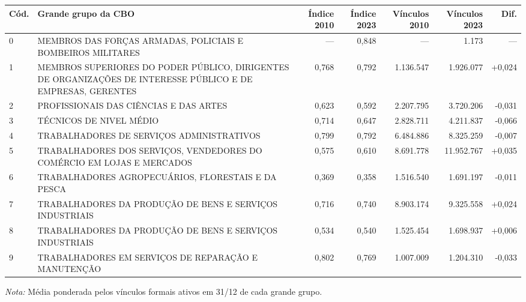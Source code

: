 \providecommand{\toprule}{\hline\hline}
\providecommand{\midrule}{\hline}
\providecommand{\bottomrule}{\hline\hline}
\providecommand{\addlinespace}[1][]{}
{\small
\renewcommand{\arraystretch}{1.12}
\begin{tabular}{lp{5.2cm}rrrrr}
\toprule
Cód. & Grande grupo da CBO & Índice 2010 & Índice 2023 & Vínculos 2010 & Vínculos 2023 & Dif. \\
\midrule
0 & MEMBROS DAS FORÇAS ARMADAS, POLICIAIS E BOMBEIROS MILITARES & --- & 0,848 & --- & 1.173 & --- \\
1 & MEMBROS SUPERIORES DO PODER PÚBLICO, DIRIGENTES DE ORGANIZAÇÕES DE INTERESSE PÚBLICO E DE EMPRESAS, GERENTES & 0,768 & 0,792 & 1.136.547 & 1.926.077 & +0,024 \\
2 & PROFISSIONAIS DAS CIÊNCIAS E DAS ARTES & 0,623 & 0,592 & 2.207.795 & 3.720.206 & -0,031 \\
3 & TÉCNICOS DE NIVEL MÉDIO & 0,714 & 0,647 & 2.828.711 & 4.211.837 & -0,066 \\
4 & TRABALHADORES DE SERVIÇOS ADMINISTRATIVOS & 0,799 & 0,792 & 6.484.886 & 8.325.259 & -0,007 \\
5 & TRABALHADORES DOS SERVIÇOS, VENDEDORES DO COMÉRCIO EM LOJAS E MERCADOS & 0,575 & 0,610 & 8.691.778 & 11.952.767 & +0,035 \\
6 & TRABALHADORES AGROPECUÁRIOS, FLORESTAIS E DA PESCA & 0,369 & 0,358 & 1.516.540 & 1.691.197 & -0,011 \\
7 & TRABALHADORES DA PRODUÇÃO DE BENS E SERVIÇOS INDUSTRIAIS & 0,716 & 0,740 & 8.903.174 & 9.325.558 & +0,024 \\
8 & TRABALHADORES DA PRODUÇÃO DE BENS E SERVIÇOS INDUSTRIAIS & 0,534 & 0,540 & 1.525.454 & 1.698.937 & +0,006 \\
9 & TRABALHADORES EM SERVIÇOS DE REPARAÇÃO E MANUTENÇÃO & 0,802 & 0,769 & 1.007.009 & 1.204.310 & -0,033 \\
\bottomrule
\end{tabular}
\vspace{2pt}
\par{\footnotesize \textit{Nota:} Média ponderada pelos vínculos formais ativos em 31/12 de cada grande grupo.}
}
